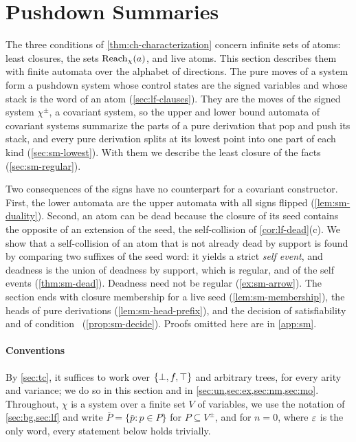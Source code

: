 
\section{Pushdown Summaries}\label{sec:sm}

The three conditions of \cref{thm:ch-characterization} concern infinite sets
of atoms: least closures, the sets $\operatorname{Reach}_\chi(a)$, and live atoms. This section
describes them with finite automata over the alphabet of directions. The pure
moves of a system form a pushdown system whose control states are the signed
variables and whose stack is the word of an atom (\cref{sec:lf-clauses}). They
are the moves of the signed system $\chi^\pm$, a covariant system, so the
upper and lower bound automata of covariant systems summarize the parts of a
pure derivation that pop and push its stack, and every pure derivation splits
at its lowest point into one part of each kind (\cref{sec:sm-lowest}). With
them we describe the least closure of the facts (\cref{sec:sm-regular}).

Two consequences of the signs have no counterpart for a covariant
constructor. First, the lower automata are the upper automata with all signs
flipped (\cref{lem:sm-duality}). Second, an atom can be dead because the
closure of its seed contains the opposite of an extension of the seed, the
self-collision of \cref{cor:lf-dead}(c). We show that a self-collision of an atom
that is not already dead by support is found by comparing two suffixes of the
seed word: it yields a strict \emph{self event}, and deadness is the union of
deadness by support, which is regular, and of the self events
(\cref{thm:sm-dead}). Deadness need not be regular (\cref{ex:sm-arrow}). The
section ends with closure membership for a live seed (\cref{lem:sm-membership}), the heads of pure derivations
(\cref{lem:sm-head-prefix}), and the decision of satisfiability and of
condition \CondI\ (\cref{prop:sm-decide}). Proofs omitted here are in
\cref{app:sm}.

\paragraph{Conventions}
By \cref{sec:tc}, it suffices to work over $\{\bot,f,\top\}$ and arbitrary trees, for
every arity and variance; we do so in this section and in
\cref{sec:un,sec:ex,sec:nm,sec:mo}. Throughout, $\chi$ is a system over a
finite set $V$ of variables, we use the
notation of \cref{sec:bg,sec:lf} and write $\bar P=\{\bar p:p\in P\}$ for
$P\subseteq V^\pm$, and for $n=0$, where $\varepsilon$ is the only word, every
statement below holds trivially.

